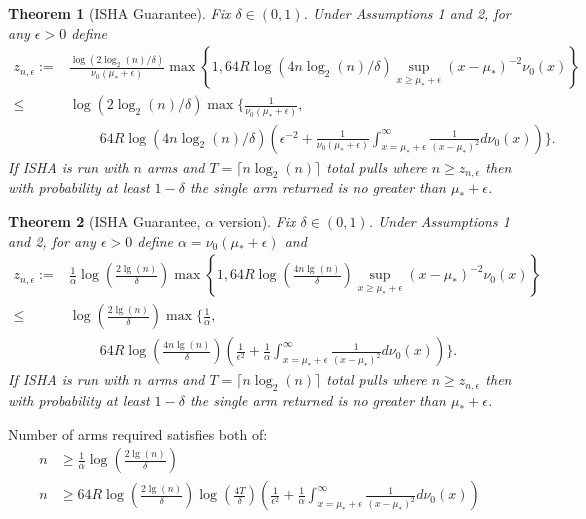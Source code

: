 \documentclass{article}
\newtheorem{theorem}{Theorem}
\begin{document}
\begin{theorem}[ISHA Guarantee]
Fix $\delta \in (0,1)$. Under Assumptions 1 and 2, for any $\epsilon >0$ define
\begin{align*}
z_{n,\epsilon} :=& \frac{\log(2 \log_2(n)/\delta)}{  \nu_0(\mu_* + \epsilon)} \max\left\{ 1, 64 R \log(4 n \log_2(n) /\delta) \sup_{x \geq \mu_* + \epsilon}  (x-\mu_*)^{-2}  \nu_0(x) \right\}\\
\leq& \log(2 \log_2(n)/\delta) \max\Bigg\{ \frac{1}{\nu_0(\mu_* + \epsilon)},
\\ &~~~~~~~~~~
64 R \log(4 n \log_2(n) /\delta) \left( \epsilon^{-2} + \frac{1}{\nu_0(\mu_* + \epsilon)}\int_{x = \mu_* + \epsilon}^\infty  \frac{1}{(x-\mu_*)^{2}}  d\nu_0(x) \right) \Bigg\}.
\end{align*}
If ISHA is run with $n$ arms and $T=\lceil n \log_2(n) \rceil$ total pulls where $n \geq z_{n,\epsilon}$ then with probability at least $1-\delta$ the single arm returned is no greater than $\mu_* +\epsilon$.
\end{theorem}

\begin{theorem}[ISHA Guarantee, $\alpha$ version]
Fix $\delta \in (0,1)$. Under Assumptions 1 and 2, for any $\epsilon >0$ define $\alpha = \nu_0(\mu_* + \epsilon)$ and
\begin{align*}
z_{n,\epsilon} :=&
    \frac{1}{\alpha}
    \log\left( \frac{ 2 \lg(n) }{ \delta } \right)
    \max\left\{ 1, 64 R \log\left( \frac{4 n \lg(n) }{ \delta } \right) 
    \sup_{x \geq \mu_* + \epsilon}  (x-\mu_*)^{-2}  \nu_0(x) \right\}
\\ \leq&
    \log\left( \frac{2 \lg(n)}{\delta} \right) \max\Bigg\{ \frac{1}{\alpha},
\\ &~~~~~~~~~~
    64 R \log\left( \frac{4 n \lg(n) }{ \delta } \right)
    \left( \frac{1}{\epsilon^{2}} + \frac{1}{\alpha}\int_{x = \mu_* + \epsilon}^\infty  \frac{1}{(x-\mu_*)^{2}}  d\nu_0(x) \right) \Bigg\}.
\end{align*}
If ISHA is run with $n$ arms and $T=\lceil n \log_2(n) \rceil$ total pulls where $n \geq z_{n,\epsilon}$ then with probability at least $1-\delta$ the single arm returned is no greater than $\mu_* +\epsilon$.
\end{theorem}

Number of arms required satisfies both of:
\begin{align}
    n &\ge \frac{1}{\alpha} \log \left( \frac{ 2 \lg(n) }{ \delta } \right)
\\
    n &\ge 64 R \log \left( \frac{ 2 \lg(n) }{ \delta } \right)
     \log\left( \frac{4 T }{ \delta } \right)
    \left( \frac{1}{\epsilon^{2}} + \frac{1}{\alpha}\int_{x = \mu_* + \epsilon}^\infty  \frac{1}{(x-\mu_*)^{2}}  d\nu_0(x) \right) 
\end{align}
\end{document}
